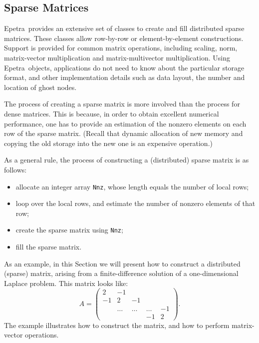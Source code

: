 \documentclass[10pt,relax]{SANDreport}
\newcommand{\epetra}{{Epetra}}
\begin{document}
\vspace*{1cm}
\vspace*{1cm}

\subsection{Sparse Matrices}
\label{sec:matrices}

\epetra\ provides an extensive set of classes to create and fill
distributed sparse matrices. These classes allow row-by-row or
element-by-element constructions. Support is provided for common matrix
operations, including scaling, norm, matrix-vector multiplication and
matrix-multivector multiplication.
Using \epetra\ objects, applications do not need to know about the
particular storage format, and other implementation details such as data
layout, the number and location of ghost nodes. 

The process of creating a sparse matrix is more involved than the
process for dense matrices. This is because, in order to obtain
excellent numerical performance, one has to provide an estimation of
the nonzero elements on each row of the sparse matrix. (Recall that
dynamic allocation of new memory and copying the old storage into the
new one is an expensive operation.)

As a general rule, the process of constructing a (distributed) sparse
matrix is as follows:
\begin{itemize}
\item allocate an integer array \verb!Nnz!, whose length equals the
  number of local rows;
\item loop over the local rows, and estimate the number of nonzero
  elements of that row;
\item create the sparse matrix using \verb!Nnz!;
\item fill the sparse matrix.
\end{itemize}

As an example, in this Section we will present how to construct a
distributed (sparse) matrix, arising from a finite-difference solution
of a one-dimensional Laplace problem. This matrix looks like:
\begin{equation*}
A = \begin{pmatrix}
 2 & -1 &     &   &    \\
-1 &  2     & -1     &        &    \\
   & \ldots & \ldots & \ldots & -1 \\
   &        &        & -1     & 2
\end{pmatrix}.
\end{equation*}
The example illustrates how to construct the matrix,
and how to perform matrix-vector operations.
\end{document}
